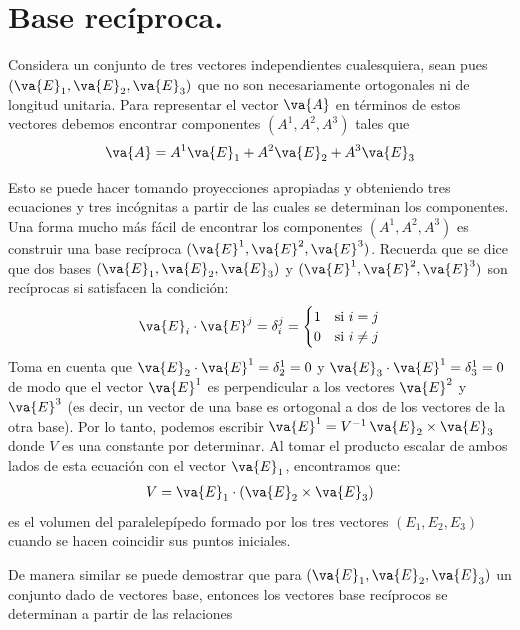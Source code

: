 \section{Base recíproca.}

Considera un conjunto de tres vectores independientes cualesquiera, sean pues $(\va{E}_{1}, \va{E}_{2}, \va{E}_{3})$ que no son necesariamente ortogonales ni de longitud unitaria. Para representar el vector $\va{A}$ en términos de estos vectores debemos encontrar componentes $(A^{1}, A^{2}, A^{3})$ tales que
\begin{align*}
\va{A} = A^{1} \va{E}_{1} + A^{2} \va{E}_{2} + A^{3} \va{E}_{3}\end{align*}

Esto se puede hacer tomando proyecciones apropiadas y obteniendo tres ecuaciones y tres incógnitas a partir de las cuales se determinan los componentes. Una forma mucho más fácil de encontrar los componentes $(A^{1}, A^{2}, A^{3})$ es construir una base recíproca $(\va{E}^{1}, \va{E}^{2}, \va{E}^{3})$. Recuerda que se dice que dos bases $(\va{E}_{1}, \va{E}_{2}, \va{E}_{3})$ y $(\va{E}^{1}, \va{E}^{2}, \va{E}^{3})$ son recíprocas si satisfacen la condición:
\begin{align*}
\va{E}_{i} \cdot \va{E}^{j} = \delta_{i}^{j} = \begin{cases}
1 & \mbox{si } i = j \\
0 & \mbox{si } i \neq j
\end{cases}
\end{align*}
Toma en cuenta que $\va{E}_{2} \cdot \va{E}^{1} = \delta_{2}^{1} = 0$ y $\va{E}_{3} \cdot \va{E}^{1} = \delta_{3}^{1} = 0$ de modo que el vector $\va{E}^{1}$ es perpendicular a los vectores $\va{E}^{2}$ y $\va{E}^{3}$ (es decir, un vector de una base es ortogonal a dos de los vectores de la otra base). Por lo tanto, podemos escribir $\va{E}^{1} = V^{-1} \, \va{E}_{2} \times \va{E}_{3}$ donde $V$ es una constante por determinar. Al tomar el producto escalar de ambos lados de esta ecuación con el vector $\va{E}_{1}$, encontramos que:
\begin{align*}
V = \va{E}_{1} \cdot (\va{E}_{2} \times \va{E}_{3})
\end{align*}
es el volumen del paralelepípedo formado por los tres vectores $(E_{1}, E_{2}, E_{3})$ cuando se hacen coincidir sus puntos iniciales.
\par
De manera similar se puede demostrar que para $(\va{E}_{1}, \va{E}_{2}, \va{E}_{3})$ un conjunto dado de vectores base, entonces los vectores base recíprocos se determinan a partir de las relaciones

